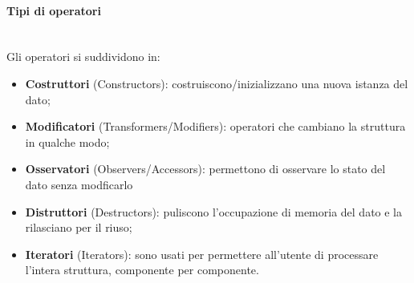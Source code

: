 \documentclass[12pt]{report}
\begin{document}
	\paragraph{Tipi di operatori} \quad \\
	Gli operatori si suddividono in:
	\begin{itemize}
		\item \textbf{Costruttori} (Constructors): costruiscono/inizializzano una nuova istanza del dato;
		\item \textbf{Modificatori} (Transformers/Modifiers): operatori che cambiano la struttura in qualche modo;
		\item \textbf{Osservatori} (Observers/Accessors): permettono di osservare lo stato del dato senza modficarlo
		\item \textbf{Distruttori} (Destructors): puliscono l'occupazione di memoria del dato e la rilasciano per il riuso;
		\item \textbf{Iteratori} (Iterators): sono usati per permettere all'utente di processare l'intera struttura, componente per componente.
	\end{itemize}
\end{document}
